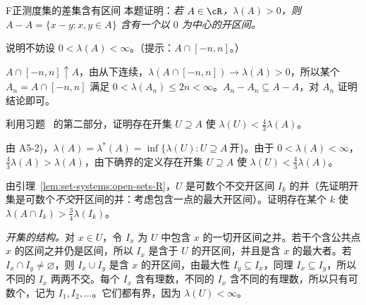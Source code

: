 \begin{probleme}{F}{正测度集的差集含有区间}
本题证明：\emph{若 $A\in\cR$，$\lambda(A)>0$，则 $A-A=\{x-y:x,y\in A\}$ 含有一个以 $0$ 为中心的开区间。}
\begin{questions}
\item 说明不妨设 $0<\lambda(A)<\infty$。（提示：$A\cap[-n,n]$。）
\begin{solution}
$A\cap[-n,n]\uparrow A$，由从下连续，$\lambda(A\cap[-n,n])\to\lambda(A)>0$，所以某个 $A_n=A\cap[-n,n]$ 满足 $0<\lambda(A_n)\leqslant2n<\infty$。$A_n-A_n\subseteq A-A$，对 $A_n$ 证明结论即可。
\end{solution}
\item 利用习题~ 的第二部分，证明存在开集 $U\supseteq A$ 使 $\lambda(U)<\frac43\lambda(A)$。
\begin{solution}
由 A5-2)，$\lambda(A)=\lambda^*(A)=\inf\{\lambda(U):U\supseteq A\ \text{开}\}$。由于 $0<\lambda(A)<\infty$，$\frac43\lambda(A)>\lambda(A)$，由下确界的定义存在开集 $U\supseteq A$ 使 $\lambda(U)<\frac43\lambda(A)$。
\end{solution}
\item 由引理~\ref{lem:set-systems:open-sets-R}，$U$ 是可数个不交开区间 $I_k$ 的并（先证明开集是可数个\emph{不交}开区间的并：考虑包含一点的最大开区间）。证明存在某个 $k$ 使 $\lambda(A\cap I_k)>\frac34\lambda(I_k)$。
\begin{solution}
\emph{开集的结构。}对 $x\in U$，令 $I_x$ 为 $U$ 中包含 $x$ 的一切开区间之并。若干个含公共点 $x$ 的区间之并仍是区间，所以 $I_x$ 是含于 $U$ 的开区间，并且是含 $x$ 的最大者。若 $I_x\cap I_y\neq\varnothing$，则 $I_x\cup I_y$ 是含 $x$ 的开区间，由最大性 $I_y\subseteq I_x$，同理 $I_x\subseteq I_y$，所以不同的 $I_x$ 两两不交。每个 $I_x$ 含有理数，不同的 $I_x$ 含不同的有理数，所以只有可数个，记为 $I_1,I_2,\dots$。它们都有界，因为 $\lambda(U)<\infty$。


\end{solution}
\end{questions}
\end{probleme}
